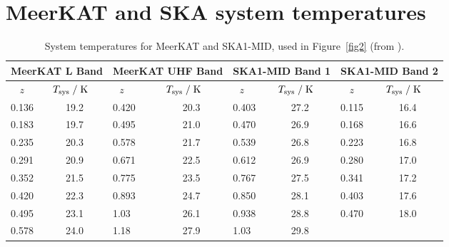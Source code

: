 \clearpage

\section{MeerKAT and SKA system temperatures} \label{app2}
\vspace*{-0.5cm}
\begin{table}[! ht]
\centering
\caption{\label{tab5} System temperatures for MeerKAT and SKA1-MID, used in Figure~\ref{fig2} (from \cite{Fonseca:2019qek}).} 
\vspace*{0.2cm}
  \begin{tabular}{|l|l|l|l|l|l|l|l|}
    \hline
      \multicolumn{2}{|c|}{MeerKAT L Band} &
      \multicolumn{2}{c|}{MeerKAT UHF Band} &
      \multicolumn{2}{c|}{SKA1-MID Band 1} & 
      \multicolumn{2}{c|}{SKA1-MID Band 2} \\
      \hline \hline
    $~~~~z~~$ & $~~T_{\rm sys}\;/\;\rm K~~~$ & $~~~z~$ & $~~~~T_{\rm sys}\;/\;\rm K~~$ & $~~~z~$ & $~~T_{\rm sys}\;/\;\rm K~~$ & $~~~~z~~$ & $~~T_{\rm sys}\;/\;\rm K~~$ \\
    \hline
    
  
     0.136 & ~~~~19.2 & 0.420 & ~~~~~~20.3 & 0.403 & ~~~~27.2 & 0.115 & ~~~~16.4 \\
    
     0.183 & ~~~~19.7 & 0.495 & ~~~~~~21.0 & 0.470 & ~~~~26.9 & 0.168 & ~~~~16.6 \\
    
     0.235 & ~~~~20.3 & 0.578 & ~~~~~~21.7 & 0.539 & ~~~~26.8 & 0.223 & ~~~~16.8 \\
    
     0.291 & ~~~~20.9 & 0.671 & ~~~~~~22.5 & 0.612 & ~~~~26.9 & 0.280 & ~~~~17.0 \\
    
     0.352 & ~~~~21.5 & 0.775 & ~~~~~~23.5 & 0.767 & ~~~~27.5 & 0.341 & ~~~~17.2 \\
    
    0.420 & ~~~~22.3 & 0.893 & ~~~~~~24.7  & 0.850 & ~~~~28.1 & 0.403 & ~~~~17.6 \\
    
    0.495 & ~~~~23.1 & 1.03 & ~~~~~~26.1   & 0.938 & ~~~~28.8 & 0.470  & ~~~~18.0 \\
    
    0.578 & ~~~~24.0 & 1.18 & ~~~~~~27.9   & 1.03  & ~~~~29.8 &        &  \\
    

\end{tabular}
\end{table}

